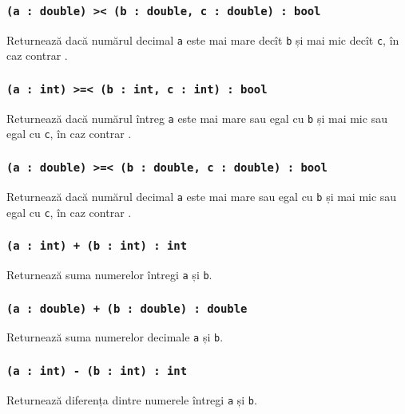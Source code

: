 \subsubsection{\texttt{(a : double) >< (b : double, c : double) : bool}}

Returnează \true{} dacă numărul decimal \texttt{a} este mai mare decît \texttt{b} și mai mic decît \texttt{c}, în caz contrar \false{}.

\subsubsection{\texttt{(a : int) >=< (b : int, c : int) : bool}}

Returnează \true{} dacă numărul întreg \texttt{a} este mai mare sau egal cu \texttt{b} și mai mic sau egal cu \texttt{c}, în caz contrar \false{}.

\subsubsection{\texttt{(a : double) >=< (b : double, c : double) : bool}}

Returnează \true{} dacă numărul decimal \texttt{a} este mai mare sau egal cu \texttt{b} și mai mic sau egal cu \texttt{c}, în caz contrar \false{}.

\subsubsection{\texttt{(a : int) + (b : int) : int}}

Returnează suma numerelor întregi \texttt{a} și \texttt{b}.

\subsubsection{\texttt{(a : double) + (b : double) : double}}

Returnează suma numerelor decimale \texttt{a} și \texttt{b}.

\subsubsection{\texttt{(a : int) - (b : int) : int}}

Returnează diferența dintre numerele întregi \texttt{a} și \texttt{b}.

